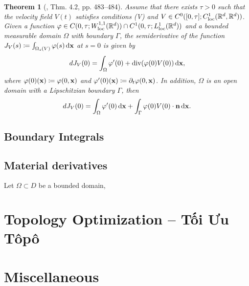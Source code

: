\documentclass{article}
\newtheorem{theorem}{Theorem}
\begin{document}
\begin{itemize}
	\begin{theorem}[\cite{Delfour_Zolesio2011}, Thm. 4.2, pp. 483--484]
		Assume that there exists $\tau > 0$ such that the velocity field $V(t)$ satisfies conditions (V) and $V\in C^0([0,\tau];C_{\rm loc}^1(\mathbb{R}^d,\mathbb{R}^d))$. Given a function $\varphi\in C(0,\tau;W_{\rm loc}^{1,1}(\mathbb{R}^d))\cap C^1(0,\tau;L_{\rm loc}^1(\mathbb{R}^d))$ and a bounded measurable domain $\Omega$ with boundary $\Gamma$, the semiderivative of the function $J_V(s)\coloneqq\int_{\Omega_s(V)} \varphi(s)\,{\rm d}{\bf x}$ at $s = 0$ is given by
		\begin{equation}
			dJ_V(0) = \int_\Omega \varphi'(0) + \operatorname{div}(\varphi(0)V(0))\,{\rm d}{\bf x},
		\end{equation}
		where $\varphi(0)({\bf x})\coloneqq\varphi(0,{\bf x})$ and $\varphi'(0)({\bf x})\coloneqq\partial_t\varphi(0,{\bf x})$. In addition, $\Omega$ is an open domain with a Lipschitzian boundary $\Gamma$, then
		\begin{equation}
			dJ_V(0) = \int_\Omega \varphi'(0)\,{\rm d}{\bf x} + \int_\Gamma \varphi(0)V(0)\cdot{\bf n}\,{\rm d}{\bf x}.
		\end{equation}
	\end{theorem}
	
\end{itemize}

\subsection{Boundary Integrals}

\subsection{Material derivatives}
Let $\Omega\subset D$ be a bounded domain, 


\section{Topology Optimization -- Tối Ưu Tôpô}


\section{Miscellaneous}


\printbibliography[heading=bibintoc]
	
\end{document}
